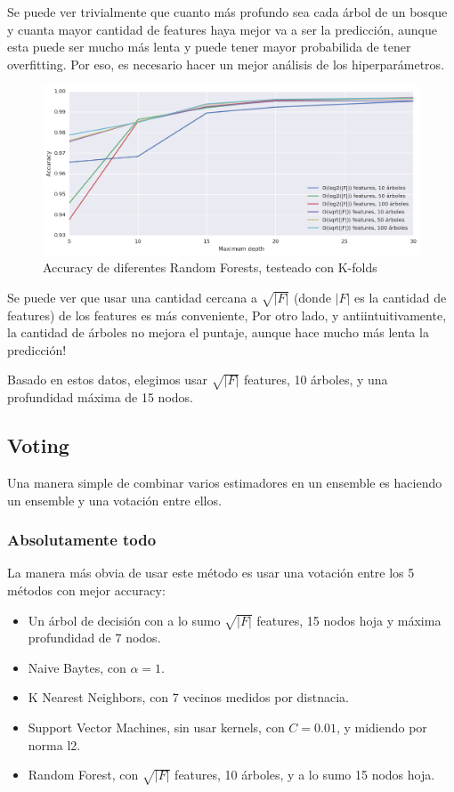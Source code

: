 \documentclass{article}
\begin{document}
Se puede ver trivialmente que cuanto más profundo sea cada árbol de un bosque y cuanta mayor cantidad de features haya mejor va a ser la predicción, aunque esta puede ser mucho más lenta y puede tener mayor probabilida de tener overfitting. Por eso, es necesario hacer un mejor análisis de los hiperparámetros.

\begin{figure}
	\centerline{\includegraphics[width=1.3\textwidth]{figures/forest.png}}
	\caption{Accuracy de diferentes Random Forests, testeado con K-folds}
\end{figure}

Se puede ver que usar una cantidad cercana a \( \sqrt{\left|F\right|} \) (donde \(\left|F\right|\) es la cantidad de features) de los features es más conveniente, Por otro lado, y antiintuitivamente, la cantidad de árboles no mejora el puntaje, aunque hace mucho más lenta la predicción!

Basado en estos datos, elegimos usar \( \sqrt{|F|} \) features, 10 árboles, y una profundidad máxima de 15 nodos.

\subsection{Voting}

Una manera simple de combinar varios estimadores en un ensemble es haciendo un ensemble y una votación entre ellos.

\subsubsection{Absolutamente todo}

La manera más obvia de usar este método es usar una votación entre los 5 métodos con mejor accuracy:

\begin{itemize}
	\item Un árbol de decisión con a lo sumo \( \sqrt{\left|F\right|} \) features, 15 nodos hoja y máxima profundidad de 7 nodos.
	\item Naive Baytes, con \( \alpha = 1 \).
	\item K Nearest Neighbors, con 7 vecinos medidos por distnacia.
	\item Support Vector Machines, sin usar kernels, con \( C = 0.01 \), y midiendo por norma l2.
	\item Random Forest, con \( \sqrt{\left|F\right|} \) features, 10 árboles, y a lo sumo 15 nodos hoja.
\end{itemize}
\end{document}
